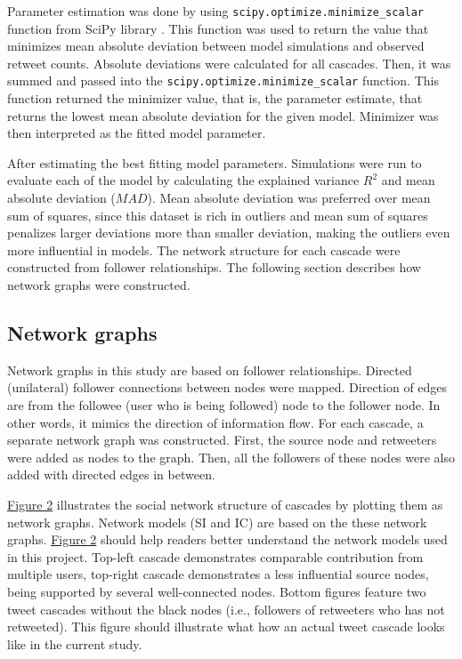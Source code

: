 \documentclass[11pt,a4paper]{article}
\begin{document}
    Parameter estimation was done by using \texttt{scipy.optimize.minimize\_scalar} function from SciPy library \cite{virtanen_scipy_2020}. This function was used to return the value that minimizes mean absolute deviation between model simulations and observed retweet counts. Absolute deviations were calculated for all cascades. Then, it was summed and passed into the \texttt{scipy.optimize.minimize\_scalar} function. This function returned the minimizer value, that is, the parameter estimate, that returns the lowest mean absolute deviation for the given model. Minimizer was then interpreted as the fitted model parameter.
    
    After estimating the best fitting model parameters. Simulations were run to evaluate each of the model by calculating the explained variance $R^2$ and mean absolute deviation ($MAD$). Mean absolute deviation was preferred over mean sum of squares, since this dataset is rich in outliers and mean sum of squares penalizes larger deviations more than smaller deviation, making the outliers even more influential in models. The network structure for each cascade were constructed from follower relationships. The following section describes how network graphs were constructed.

    \subsection{Network graphs}
        Network graphs in this study are based on follower relationships. Directed (unilateral) follower connections between nodes were mapped. Direction of edges are from the followee (user who is being followed) node to the follower node. In other words, it mimics the direction of information flow. For each cascade, a separate network graph was constructed. First, the source node and retweeters were added as nodes to the graph. Then, all the followers of these nodes were also added with directed edges in between.
        
        \hyperlink{fig:network}{Figure 2} illustrates the social network structure of cascades by plotting them as network graphs. Network models (SI and IC) are based on the these network graphs. \hyperlink{fig:network}{Figure 2} should help readers better understand the network models used in this project. Top-left cascade demonstrates comparable contribution from multiple users, top-right cascade demonstrates a less influential source nodes, being supported by several well-connected nodes. Bottom figures feature two tweet cascades without the black nodes (i.e., followers of retweeters who has not retweeted). This figure should illustrate what how an actual tweet cascade looks like in the current study.
\end{document}
